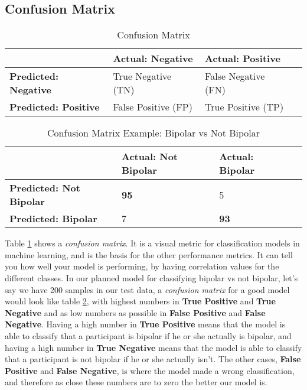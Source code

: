\subsection{Confusion Matrix}

\begin{table}
  \begin{center}
    \begin{tabular}{| l | l | l | l |}
      \hline
                                    & \textbf{Actual: Negative} & \textbf{Actual: Positive} \\ \hline
      \textbf{Predicted: Negative}  & True Negative (TN)        & False Negative (FN)       \\ \hline
      \textbf{Predicted: Positive}  & False Positive (FP)       & True Positive (TP)        \\
      \hline
    \end{tabular}
    \caption{Confusion Matrix}
    \label{table:confusion_matrix}
  \end{center}
\end{table}

\begin{table}
  \begin{center}
    \begin{tabular}{| l | l | l | l |}
      \hline
                                      & \textbf{Actual: Not Bipolar} & \textbf{Actual: Bipolar} \\ \hline
      \textbf{Predicted: Not Bipolar} & \textbf{95}                  & 5                        \\ \hline
      \textbf{Predicted: Bipolar}     & 7                            & \textbf{93}              \\
      \hline
    \end{tabular}
    \caption{Confusion Matrix Example: Bipolar vs Not Bipolar}
    \label{table:confusion_matrix_bipolar}
  \end{center}
\end{table}

Table \ref{table:confusion_matrix} shows a \textit{confusion matrix}. It is a visual metric for classification models in machine 
learning, and is the basis for the other performance metrics. It can tell you how well your model is performing, 
by having correlation values for the different classes. In our planned model for 
classifying bipolar vs not bipolar, let's say we have 200 samples in our test data, a \textit{confusion matrix} for a good model would look like 
table \ref{table:confusion_matrix_bipolar}, with highest numbers in \textbf{True Positive} and \textbf{True Negative} and as low numbers as possible in 
\textbf{False Positive} and \textbf{False Negative}. Having a high number in \textbf{True Positive} means that the model is able to classify that a 
participant is bipolar if he or she actually is bipolar, and having a high number in \textbf{True Negative} means that the model is able to classify 
that a participant is not bipolar if he or she actually isn't. The other cases, \textbf{False Positive} and \textbf{False Negative}, is where the model
made a wrong classification, and therefore as close these numbers are to zero the better our model is.

